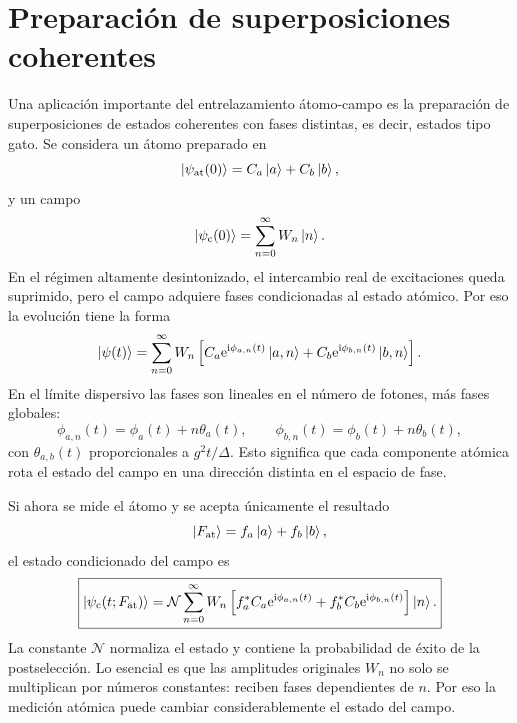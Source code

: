\documentclass[11pt]{article}
\newcommand{\ii}{\mathrm{i}}
\newcommand{\ee}{\mathrm{e}}
\begin{document}
\section{Preparaci\'on de superposiciones coherentes}

Una aplicaci\'on importante del entrelazamiento \'atomo-campo es la
preparaci\'on de superposiciones de estados coherentes con fases distintas, es
decir, estados tipo gato. Se considera un \'atomo preparado en
\begin{equation}
  \ket{\psi_{\mathrm{at}}(0)}
  =
  C_a\ket{a}+C_b\ket{b},
\end{equation}
y un campo
\begin{equation}
  \ket{\psi_{\mathrm{c}}(0)}
  =
  \sum_{n=0}^{\infty}W_n\ket{n}.
\end{equation}
En el r\'egimen altamente desintonizado, el intercambio real de excitaciones
queda suprimido, pero el campo adquiere fases condicionadas al estado
at\'omico. Por eso la evoluci\'on tiene la forma
\begin{equation}
  \ket{\psi(t)}
  =
  \sum_{n=0}^{\infty}W_n
  \left[
  C_a\ee^{\ii\phi_{a,n}(t)}\ket{a,n}
  +
  C_b\ee^{\ii\phi_{b,n}(t)}\ket{b,n}
  \right].
\end{equation}
En el l\'imite dispersivo las fases son lineales en el n\'umero de fotones,
m\'as fases globales:
\begin{equation}
  \phi_{a,n}(t)=\phi_a(t)+n\theta_a(t),
  \qquad
  \phi_{b,n}(t)=\phi_b(t)+n\theta_b(t),
\end{equation}
con $\theta_{a,b}(t)$ proporcionales a $g^2t/\Delta$. Esto significa que cada
componente at\'omica rota el estado del campo en una direcci\'on distinta en el
espacio de fase.

Si ahora se mide el \'atomo y se acepta \'unicamente el resultado
\begin{equation}
  \ket{F_{\mathrm{at}}}=f_a\ket{a}+f_b\ket{b},
\end{equation}
el estado condicionado del campo es
\begin{equation}
  \boxed{
  \ket{\psi_{\mathrm{c}}(t;F_{\mathrm{at}})}
  =
  \mathcal N
  \sum_{n=0}^{\infty}W_n
  \left[
  f_a^*C_a\ee^{\ii\phi_{a,n}(t)}
  +
  f_b^*C_b\ee^{\ii\phi_{b,n}(t)}
  \right]\ket{n}.
  }
\end{equation}
La constante $\mathcal N$ normaliza el estado y contiene la probabilidad de
\'exito de la postselecci\'on. Lo esencial es que las amplitudes originales
$W_n$ no solo se multiplican por n\'umeros constantes: reciben fases
dependientes de $n$. Por eso la medici\'on at\'omica puede cambiar
considerablemente el estado del campo.
\end{document}

